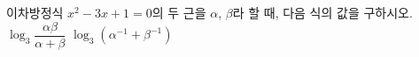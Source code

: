 이차방정식 $x^2-3x+1=0$의 두 근을 $\alpha$, $\beta$라 할 때, 다음 식의 값을 구하시오.
 $\log_3 \dfrac{\alpha\beta}{\alpha+\beta}$
 $\log_3 (\alpha^{-1}+\beta^{-1})$
